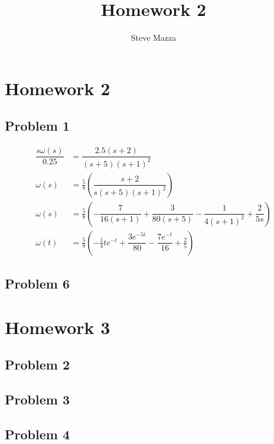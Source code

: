 \documentclass[letterpaper,10pt]{article}
\title{Homework 2}
\author{Steve Mazza}
\begin{document}
\maketitle

\section*{Homework 2}
\subsection*{Problem 1}
\begin{align*}
	\dfrac{s\omega(s)}{0.25} &= \dfrac{2.5(s+2)}{(s+5)(s+1)^2} \\
	\omega(s) &= \frac{5}{8}\left(\dfrac{s+2}{s(s+5)(s+1)^2}\right) \\
	\omega(s) &= \frac{5}{8}\left(-\dfrac{7}{16(s+1)} + \dfrac{3}{80(s+5)} - \dfrac{1}{4(s+1)^2}+ \dfrac{2}{5s}\right) \\
	\omega(t) &= \frac{5}{8}\left(-\frac{1}{4}te^{-t} + \dfrac{3e^{-5t}}{80} - \dfrac{7e^{-t}}{16} + \frac{2}{5}\right)
\end{align*}

\subsection*{Problem 6}

\section*{Homework 3}
\subsection*{Problem 2}

\subsection*{Problem 3}

\subsection*{Problem 4}
\end{document}
